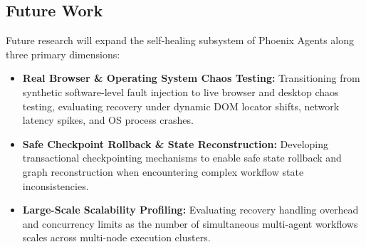\documentclass[conference]{IEEEtran}
\begin{document}
\subsection{Future Work}
Future research will expand the self-healing subsystem of Phoenix Agents along three primary dimensions:
\begin{itemize}
    \item \textbf{Real Browser \& Operating System Chaos Testing:} Transitioning from synthetic software-level fault injection to live browser and desktop chaos testing, evaluating recovery under dynamic DOM locator shifts, network latency spikes, and OS process crashes.
    \item \textbf{Safe Checkpoint Rollback \& State Reconstruction:} Developing transactional checkpointing mechanisms to enable safe state rollback and graph reconstruction when encountering complex workflow state inconsistencies.
    \item \textbf{Large-Scale Scalability Profiling:} Evaluating recovery handling overhead and concurrency limits as the number of simultaneous multi-agent workflows scales across multi-node execution clusters.
\end{itemize}
\end{document}
